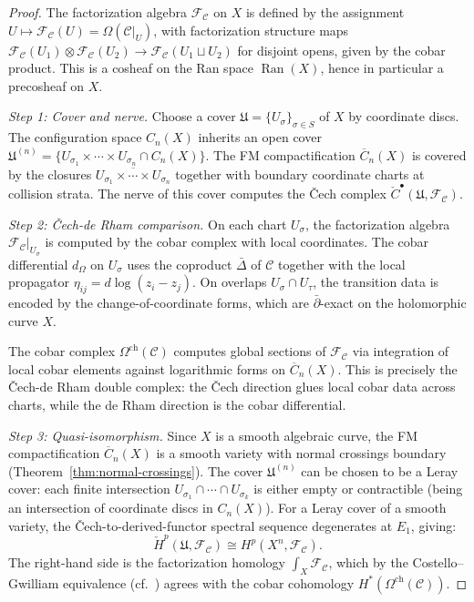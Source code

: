 \begin{proof}
The factorization algebra $\mathcal{F}_{\mathcal{C}}$ on $X$ is defined by the assignment $U \mapsto \mathcal{F}_{\mathcal{C}}(U) = \Omega(\mathcal{C}|_U)$, with factorization structure maps $\mathcal{F}_{\mathcal{C}}(U_1) \otimes \mathcal{F}_{\mathcal{C}}(U_2) \to \mathcal{F}_{\mathcal{C}}(U_1 \sqcup U_2)$ for disjoint opens, given by the cobar product.  This is a cosheaf on the Ran space $\operatorname{Ran}(X)$, hence in particular a precosheaf on $X$.

\emph{Step 1: Cover and nerve.}
Choose a cover $\mathfrak{U} = \{U_\sigma\}_{\sigma \in S}$ of $X$ by coordinate discs.  The configuration space $C_n(X)$ inherits an open cover $\mathfrak{U}^{(n)} = \{U_{\sigma_1} \times \cdots \times U_{\sigma_n} \cap C_n(X)\}$.  The FM compactification $\overline{C}_n(X)$ is covered by the closures $\overline{U_{\sigma_1} \times \cdots \times U_{\sigma_n}}$ together with boundary coordinate charts at collision strata.  The nerve of this cover computes the Čech complex $\check{C}^\bullet(\mathfrak{U}, \mathcal{F}_{\mathcal{C}})$.

\emph{Step 2: Čech-de Rham comparison.}
On each chart $U_\sigma$, the factorization algebra $\mathcal{F}_{\mathcal{C}}|_{U_\sigma}$ is computed by the cobar complex with local coordinates.  The cobar differential $d_\Omega$ on $U_\sigma$ uses the coproduct $\bar{\Delta}$ of $\mathcal{C}$ together with the local propagator $\eta_{ij} = d\log(z_i - z_j)$.  On overlaps $U_\sigma \cap U_\tau$, the transition data is encoded by the change-of-coordinate forms, which are $\bar{\partial}$-exact on the holomorphic curve $X$.

The cobar complex $\Omega^{\mathrm{ch}}(\mathcal{C})$ computes global sections of $\mathcal{F}_{\mathcal{C}}$ via integration of local cobar elements against logarithmic forms on $\overline{C}_n(X)$.  This is precisely the Čech-de Rham double complex: the Čech direction glues local cobar data across charts, while the de Rham direction is the cobar differential.

\emph{Step 3: Quasi-isomorphism.}
Since $X$ is a smooth algebraic curve, the FM compactification $\overline{C}_n(X)$ is a smooth variety with normal crossings boundary (Theorem~\ref{thm:normal-crossings}).  The cover $\mathfrak{U}^{(n)}$ can be chosen to be a Leray cover: each finite intersection $U_{\sigma_1} \cap \cdots \cap U_{\sigma_k}$ is either empty or contractible (being an intersection of coordinate discs in $C_n(X)$).  For a Leray cover of a smooth variety, the Čech-to-derived-functor spectral sequence degenerates at $E_1$, giving:
\[
\check{H}^p(\mathfrak{U}, \mathcal{F}_{\mathcal{C}}) \cong H^p(X^n, \mathcal{F}_{\mathcal{C}}).
\]
The right-hand side is the factorization homology $\int_X \mathcal{F}_{\mathcal{C}}$, which by the Costello--Gwilliam equivalence (cf.\ \cite{CG17}) agrees with the cobar cohomology $H^*(\Omega^{\mathrm{ch}}(\mathcal{C}))$.
\end{proof}

